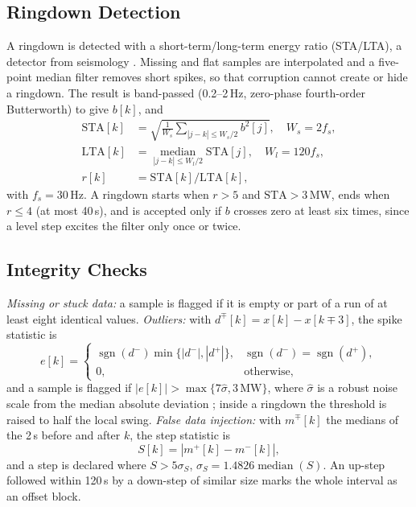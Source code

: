 \documentclass[12pt,letterpaper]{article}
\begin{document}
\subsection{Ringdown Detection}
A ringdown is detected with a short-term/long-term energy ratio (STA/LTA), a detector from seismology \cite{allen1978}. Missing and flat samples are interpolated and a five-point median filter removes short spikes, so that corruption cannot create or hide a ringdown. The result is band-passed (0.2--2\,Hz, zero-phase fourth-order Butterworth) to give $b[k]$, and
\begin{align}
\mathrm{STA}[k] &= \sqrt{\tfrac{1}{W_s}\textstyle\sum_{|j-k|\le W_s/2} b^2[j]},\quad W_s=2f_s,\nonumber\\
\mathrm{LTA}[k] &= \operatorname*{median}_{|j-k|\le W_l/2}\mathrm{STA}[j],\quad W_l=120f_s,\label{eq:lta}\\
r[k] &= \mathrm{STA}[k]/\mathrm{LTA}[k],\label{eq:ratio}
\end{align}
with $f_s=30$\,Hz. A ringdown starts when $r>5$ and $\mathrm{STA}>3$\,MW, ends when $r\le4$ (at most 40\,s), and is accepted only if $b$ crosses zero at least six times, since a level step excites the filter only once or twice.

\subsection{Integrity Checks}
\emph{Missing or stuck data:} a sample is flagged if it is empty or part of a run of at least eight identical values. \emph{Outliers:} with $d^\mp[k]=x[k]-x[k\mp3]$, the spike statistic is
\begin{equation}
e[k]=\begin{cases}\operatorname{sgn}(d^-)\min\{|d^-|,|d^+|\}, & \operatorname{sgn}(d^-)=\operatorname{sgn}(d^+),\\ 0, & \text{otherwise,}\end{cases}\label{eq:spike}
\end{equation}
and a sample is flagged if $|e[k]|>\max\{7\hat\sigma,3\,\text{MW}\}$, where $\hat\sigma$ is a robust noise scale from the median absolute deviation \cite{hampel1974}; inside a ringdown the threshold is raised to half the local swing. \emph{False data injection:} with $m^\mp[k]$ the medians of the 2\,s before and after $k$, the step statistic is
\begin{equation}
S[k]=|m^+[k]-m^-[k]|,\label{eq:step}
\end{equation}
and a step is declared where $S>5\sigma_S$, $\sigma_S=1.4826\operatorname{median}(S)$. An up-step followed within 120\,s by a down-step of similar size marks the whole interval as an offset block.
\end{document}
